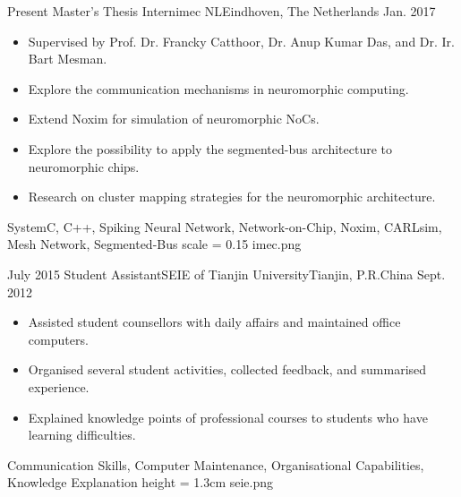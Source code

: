 %
%
%
%
%

\begin{experiences}
	\experience
    {Present}	{Master's Thesis Intern}{imec NL}{Eindhoven, The Netherlands}
    {Jan. 2017}	{
    				\begin{itemize}
                    	\item Supervised by Prof. Dr. Francky Catthoor, Dr. Anup Kumar Das, and Dr. Ir. Bart Mesman.
    					\item Explore the communication mechanisms in neuromorphic computing.
                        \item Extend Noxim for simulation of neuromorphic NoCs.
                        \item Explore the possibility to apply the segmented-bus architecture to neuromorphic chips. 
                        \item Research on cluster mapping strategies for the neuromorphic architecture.
    				\end{itemize}
    			}
                {SystemC, C++, Spiking Neural Network, Network-on-Chip, Noxim, CARLsim, Mesh Network, Segmented-Bus}
     {scale = 0.15}		{imec.png} 
	\emptySeparator
    
    
    \experience
    {July 2015}	{Student Assistant}{SEIE of Tianjin University}{Tianjin, P.R.China}
    {Sept. 2012}	{
    				\begin{itemize}
                    	\item Assisted student counsellors with daily affairs and maintained office computers. 
    					\item Organised several student activities, collected feedback, and summarised experience.
                        \item Explained knowledge points of professional courses to students who have learning difficulties.
    				\end{itemize}
    			}
                {Communication Skills, Computer Maintenance, Organisational Capabilities, Knowledge Explanation}
     {height = 1.3cm}		{seie.png} 
    
\end{experiences}